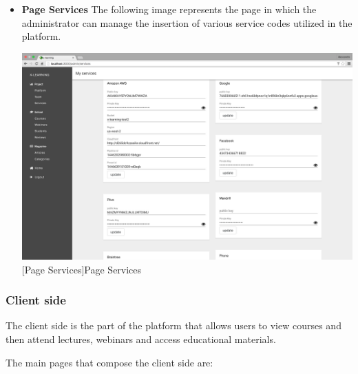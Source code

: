 \begin{itemize}
\item \textbf{Page Services} The following image represents the page in which the administrator can manage the insertion of various service codes utilized in the platform.
\\
\par

\begin{minipage}{\linewidth}
    \centering
    \includegraphics[width=0.9\linewidth]{images/chapter4/page-services-admin.png}
    [Page Services]{Page Services}
\end{minipage}

\end{itemize}


\subsubsection {Client side}
\label{subsec:Client_side}
The client side is the part of the platform that allows users to view courses and then attend lectures, webinars and access educational materials.

The main pages that compose the client side are:

